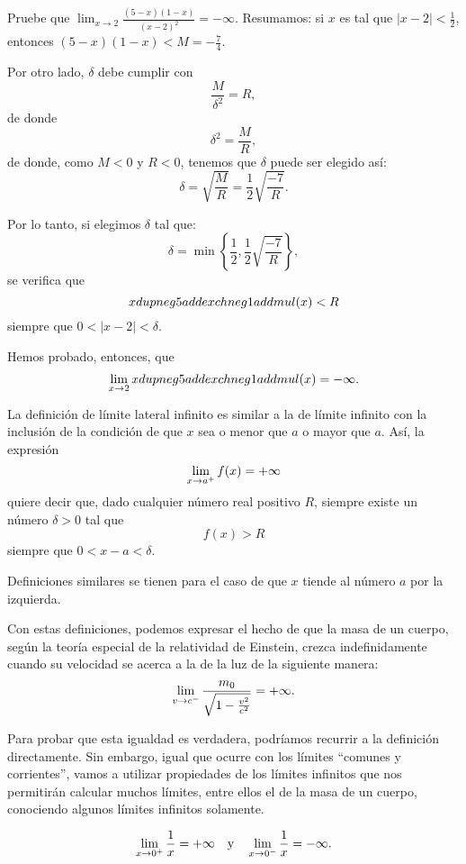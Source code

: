 \begin{exemplo}[Solución]{%
Pruebe que $\displaystyle \lim_{x\to 2}\frac{(5-x)(1 - x)}{(x-2)^2}=-\infty$.}
Resumamos: si $x$ es tal que $|x - 2| < \frac{1}{2}$, entonces $(5 - x)(1 - x) < M = -\frac{7}{4}$.

Por otro lado, $\delta$ debe cumplir con
\[
\frac{M}{\delta^2} = R,
\]
de donde
\[
\delta^2 = \frac{M}{R},
\]
de donde, como $M < 0$ y $R < 0$, tenemos que $\delta$ puede ser elegido así:
\[
\delta = \sqrt{\frac{M}{R}} = \frac{1}{2}\sqrt{\frac{-7}{R}}.
\]

Por lo tanto, si elegimos $\delta$ tal que:
\begin{equation*}
	\delta = \min\left\{\frac{1}{2},\frac{1}{2}\sqrt{\frac{-7}{R}}\right\},
\end{equation*}
se verifica que
\[
\f(x) < R
\]
siempre que $0 < |x - 2| < \delta$.

Hemos probado, entonces, que
\[
\limjc{\f(x)}{x}{2} = -\infty.
\]
\end{exemplo}

La definición de límite lateral infinito es similar a la de límite infinito con la inclusión de la
condición de que $x$ sea o menor que $a$ o mayor que $a$. Así, la expresión
\[
\limjc{f(x)}{x}{a^+} = +\infty
\]
quiere decir que, dado cualquier número real positivo $R$, siempre existe un número $\delta > 0$
tal que
\[
f(x) > R
\]
siempre que $0 < x - a < \delta$.

Definiciones similares se tienen para el caso de que $x$ tiende al número $a$ por la izquierda.

Con estas definiciones, podemos expresar el hecho de que la masa de un cuerpo, según la teoría
especial de la relatividad de Einstein, crezca indefinidamente cuando su velocidad se acerca a la
de la luz de la siguiente manera:
\begin{equation}
\label{eq:LimMasaEinstein}
\limjc{\frac{m_0}{\sqrt{1 - \frac{v^2}{c^2}}}}{v}{c^-} = +\infty.
\end{equation}

Para probar que esta igualdad es verdadera, podríamos recurrir a la definición directamente. Sin
embargo, igual que ocurre con los límites ``comunes y corrientes'', vamos a utilizar propiedades de
los límites infinitos que nos permitirán calcular muchos límites, entre ellos el de la masa de un
cuerpo, conociendo algunos límites infinitos solamente.

\begin{teocal}\label{teo:LimUnoSobreCero}%
\[
\limjc{\frac{1}{x}}{x}{0^+} = +\infty \yjc \limjc{\frac{1}{x}}{x}{0^-} = -\infty.
\]
\end{teocal}

